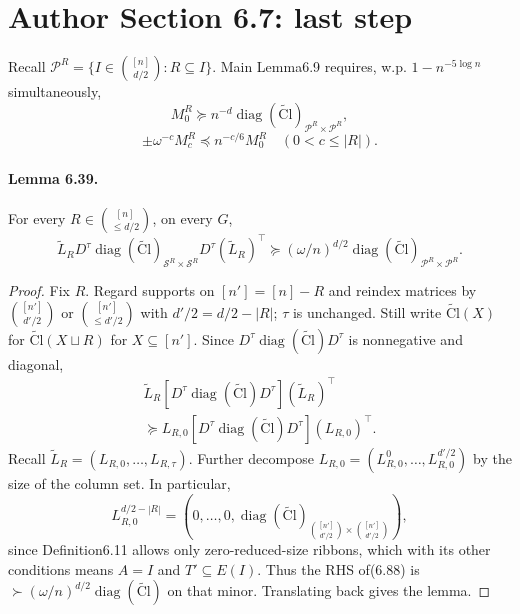 \section*{Author Section 6.7: last step}
Recall $\mathcal P^R=\{I\in\binom{[n]}{d/2}:R\subseteq I\}$. Main Lemma6.9 requires, w.p. $1-n^{-5\log n}$ simultaneously,
\[M_0^R\succeq n^{-d}\operatorname{diag}(\widetilde{\mathrm{Cl}})_{\mathcal P^R\times\mathcal P^R},\tag{6.86}\]
\[\pm\omega^{-c}M_c^R\preceq n^{-c/6}M_0^R\quad(0<c\le|R|).\tag{6.87}\]
\paragraph{Lemma 6.39.} For every $R\in\binom{[n]}{\le d/2}$, on every $G$,
\[\widetilde L_RD^\tau\operatorname{diag}(\widetilde{\mathrm{Cl}})_{\mathcal S^R\times\mathcal S^R}D^\tau(\widetilde L_R)^\top\succeq(\omega/n)^{d/2}\operatorname{diag}(\widetilde{\mathrm{Cl}})_{\mathcal P^R\times\mathcal P^R}.\]
\begin{proof}Fix $R$. Regard supports on $[n']=[n]-R$ and reindex matrices by $\binom{[n']}{d'/2}$ or $\binom{[n']}{\le d'/2}$ with $d'/2=d/2-|R|$; $\tau$ is unchanged. Still write $\widetilde{\mathrm{Cl}}(X)$ for $\widetilde{\mathrm{Cl}}(X\sqcup R)$ for $X\subseteq[n']$. Since $D^\tau\operatorname{diag}(\widetilde{\mathrm{Cl}})D^\tau$ is nonnegative and diagonal,
\begin{multline*}\widetilde L_R[D^\tau\operatorname{diag}(\widetilde{\mathrm{Cl}})D^\tau](\widetilde L_R)^\top\\\succeq L_{R,0}[D^\tau\operatorname{diag}(\widetilde{\mathrm{Cl}})D^\tau](L_{R,0})^\top.\tag{6.88}\end{multline*}
Recall $\widetilde L_R=(L_{R,0},\ldots,L_{R,\tau})$. Further decompose $L_{R,0}=(L_{R,0}^0,\ldots,L_{R,0}^{d'/2})$ by the size of the column set. In particular,
\[L_{R,0}^{d/2-|R|}=(0,\ldots,0,\operatorname{diag}(\widetilde{\mathrm{Cl}})_{\binom{[n']}{d'/2}\times\binom{[n']}{d'/2}}),\]
since Definition6.11 allows only zero-reduced-size ribbons, which with its other conditions means $A=I$ and $T'\subseteq E(I)$. Thus the RHS of(6.88) is $\succ(\omega/n)^{d/2}\operatorname{diag}(\widetilde{\mathrm{Cl}})$ on that minor. Translating back gives the lemma.\end{proof}
